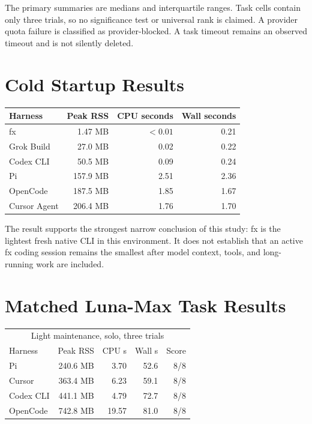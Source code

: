 \documentclass[11pt]{article}
\begin{document}
The primary summaries are medians and interquartile ranges. Task cells contain
only three trials, so no significance test or universal rank is claimed. A
provider quota failure is classified as provider-blocked. A task timeout remains
an observed timeout and is not silently deleted.

\section{Cold Startup Results}

\begin{center}
\begin{tabular}{lrrr}
\toprule
Harness & Peak RSS & CPU seconds & Wall seconds \\
\midrule
fx & 1.47 MB & $<0.01$ & 0.21 \\
Grok Build & 27.0 MB & 0.02 & 0.22 \\
Codex CLI & 50.5 MB & 0.09 & 0.24 \\
Pi & 157.9 MB & 2.51 & 2.36 \\
OpenCode & 187.5 MB & 1.85 & 1.67 \\
Cursor Agent & 206.4 MB & 1.76 & 1.70 \\
\bottomrule
\end{tabular}
\end{center}

The result supports the strongest narrow conclusion of this study: fx is the
lightest fresh native CLI in this environment. It does not establish that an
active fx coding session remains the smallest after model context, tools, and
long-running work are included.

\section{Matched Luna-Max Task Results}

\begin{center}
\begin{tabular}{lrrrr}
\toprule
\multicolumn{5}{c}{Light maintenance, solo, three trials} \\
Harness & Peak RSS & CPU s & Wall s & Score \\
\midrule
Pi & 240.6 MB & 3.70 & 52.6 & 8/8 \\
Cursor & 363.4 MB & 6.23 & 59.1 & 8/8 \\
Codex CLI & 441.1 MB & 4.79 & 72.7 & 8/8 \\
OpenCode & 742.8 MB & 19.57 & 81.0 & 8/8 \\
\bottomrule
\end{tabular}
\end{center}
\end{document}
